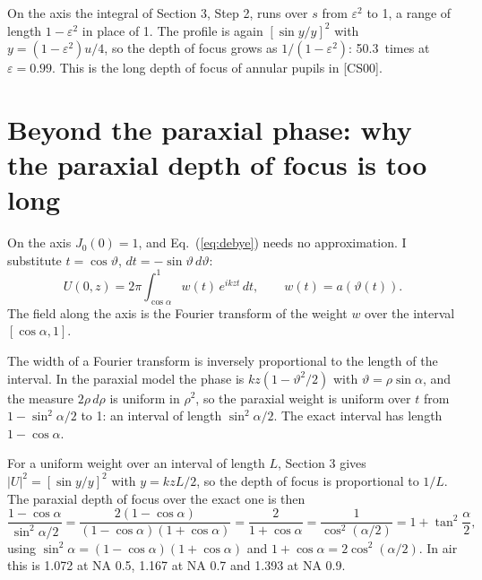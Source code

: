 \documentclass[11pt]{article}
\begin{document}
 On the axis the integral of Section 3, Step 2, runs over $s$ from $\varepsilon^2$ to 1, a
range of length $1 - \varepsilon^2$ in place of 1. The profile is again $[\sin y/y]^2$ with
$y = (1 - \varepsilon^2)u/4$, so the depth of focus grows as $1/(1 - \varepsilon^2)$: 50.3\ times at
$\varepsilon = 0.99$. This is the long depth of focus of annular pupils in [CS00].


\section{Beyond the paraxial phase: why the paraxial depth of focus is too long}
 On the axis $J_0(0) = 1$, and Eq.~(\ref{eq:debye}) needs no approximation. I substitute $t = \cos\vartheta$,
$dt = -\sin\vartheta\,d\vartheta$:
\begin{equation}U(0,z) = 2\pi\int_{\cos\alpha}^1 w(t)\,e^{ikzt}\,dt,\qquad w(t) = a(\vartheta(t)) .\end{equation}
The field along the axis is the Fourier transform of the weight $w$ over the interval $[\cos\alpha, 1]$.

 The width of a Fourier transform is inversely proportional to the length of the interval. In the paraxial
model the phase is $kz(1 - \vartheta^2/2)$ with $\vartheta = \rho\sin\alpha$, and the measure $2\rho\,d\rho$ is
uniform in $\rho^2$, so the paraxial weight is uniform over $t$ from $1 - \sin^2\!\alpha/2$ to 1: an interval of
length $\sin^2\!\alpha/2$. The exact interval has length $1 - \cos\alpha$.

 For a uniform weight over an interval of length $L$, Section 3 gives $|U|^2 = [\sin y/y]^2$ with
$y = kzL/2$, so the depth of focus is proportional to $1/L$. The paraxial depth of focus over the exact one is then
\begin{equation}\frac{1 - \cos\alpha}{\sin^2\!\alpha/2} = \frac{2(1 - \cos\alpha)}{(1 - \cos\alpha)(1 + \cos\alpha)}
= \frac{2}{1 + \cos\alpha} = \frac{1}{\cos^2(\alpha/2)} = 1 + \tan^2\frac\alpha2 ,\end{equation}
using $\sin^2\alpha = (1 - \cos\alpha)(1 + \cos\alpha)$ and $1 + \cos\alpha = 2\cos^2(\alpha/2)$. In air this is
1.072 at NA 0.5, 1.167 at NA 0.7 and 1.393 at NA 0.9.
\end{document}
